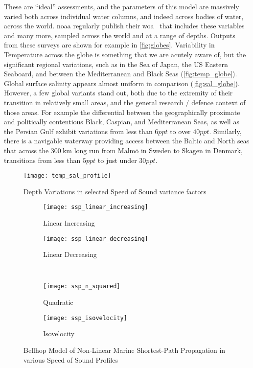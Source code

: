 These are ``ideal'' assessments, and the parameters of this model are massively varied both across individual water columns, and indeed across bodies of water, across the world. 
\gls{noaa} regularly publish their \gls{woa}~\cite{Locarnini2013,Zweng2013} that includes these variables and many more, sampled across the world and at a range of depths. 
Outputs from these surveys are shown for example in \autoref{fig:globes}. 
Variability in Temperature across the globe is something that we are acutely aware of, but the significant regional variations, such as in the Sea of Japan, the US Eastern Seaboard, and between the Mediterranean and Black Seas (\autoref{fig:temp_globe}).
Global surface salinity appears almost uniform in comparison (\autoref{fig:sal_globe}).
However, a few global variants stand out, both due to the extremity of their transition in relatively small areas, and the general research / defence context of those areas. 
For example the differential between the geographically proximate and politically contentious Black, Caspian, and Mediterranean Seas, as well as the Persian Gulf exhibit variations from less than $6ppt$ to over $40ppt$.
Similarly, there is a navigable waterway providing access between the Baltic and North seas that across the $\SI{300}{\kilo\meter}$ long run from Malm{\"o} in Sweden to Skagen in Denmark, transitions from less than $5ppt$ to just under $30ppt$. 


\begin{figure}
	\centering
	\texttt{[image: temp\_sal\_profile]}
	\caption{Depth Variations in selected Speed of Sound variance factors}
	\label{fig:temp_sal_profile}
\end{figure}


\begin{figure}
	\begin{subfigure}[t]{0.45\textwidth}
		\centering
		\texttt{[image: ssp\_linear\_increasing]}
		\caption{Linear Increasing}
		\label{fig:ssp_linear_increasing}
	\end{subfigure}
	\begin{subfigure}[t]{0.45\textwidth}
		\centering
		\texttt{[image: ssp\_linear\_decreasing]}
		\caption{Linear Decreasing}
		\label{fig:ssp_linear_decreasing}
	\end{subfigure}\\
	\begin{subfigure}[t]{0.45\textwidth}
		\centering
		\texttt{[image: ssp\_n\_squared]}
		\caption{Quadratic}
		\label{fig:ssp_n_squared}
	\end{subfigure}
	\begin{subfigure}[t]{0.45\textwidth}
		\centering
		\texttt{[image: ssp\_isovelocity]}
		\caption{Isovelocity}
		\label{fig:ssp_isovelocity}
	\end{subfigure}
	\caption{Bellhop Model of Non-Linear Marine Shortest-Path Propagation in various Speed of Sound Profiles}
	\label{fig:ssps}
\end{figure}

